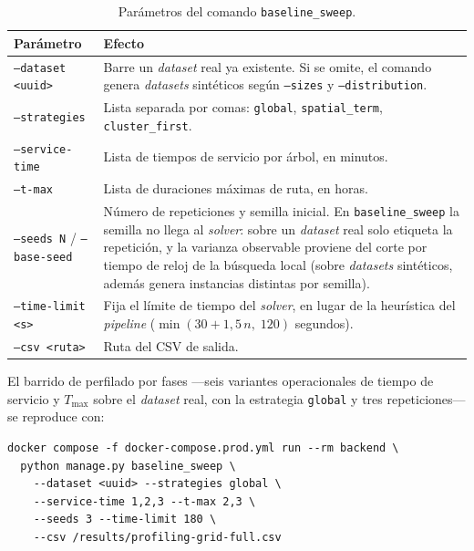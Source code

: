 \begin{table}[H]
  \centering
  \caption{Parámetros del comando \texttt{baseline\_sweep}.}
  \label{tab:anexo_baseline_sweep}
  \small
  \begin{tabularx}{\textwidth}{@{}p{5.5cm} X@{}}
    \toprule
    Parámetro &
      Efecto \\
    \midrule
    \texttt{--dataset <uuid>} &
      Barre un \textit{dataset} real ya existente. Si se omite, el comando genera
      \textit{datasets} sintéticos según \texttt{--sizes} y \texttt{--distribution}. \\
    \texttt{--strategies} &
      Lista separada por comas: \texttt{global}, \texttt{spatial\_term},
      \texttt{cluster\_first}. \\
    \texttt{--service-time} &
      Lista de tiempos de servicio por árbol, en minutos. \\
    \texttt{--t-max} &
      Lista de duraciones máximas de ruta, en horas. \\
    \texttt{--seeds N} / \texttt{--base-seed} &
      Número de repeticiones y semilla inicial. En \texttt{baseline\_sweep} la semilla no llega
      al \textit{solver}: sobre un \textit{dataset} real solo etiqueta la repetición, y la
      varianza observable proviene del corte por tiempo de reloj de la búsqueda local (sobre
      \textit{datasets} sintéticos, además genera instancias distintas por semilla). \\
    \texttt{--time-limit <s>} &
      Fija el límite de tiempo del \textit{solver}, en lugar de la heurística del
      \textit{pipeline} ($\min(30 + 1{,}5\,n,\;120)$ segundos). \\
    \texttt{--csv <ruta>} &
      Ruta del CSV de salida. \\
    \bottomrule
  \end{tabularx}
\end{table}

El barrido de perfilado por fases ---seis variantes operacionales de tiempo de
servicio y $T_{\max}$ sobre el \textit{dataset} real, con la estrategia \texttt{global}
y tres repeticiones--- se reproduce con:

\begin{verbatim}
docker compose -f docker-compose.prod.yml run --rm backend \
  python manage.py baseline_sweep \
    --dataset <uuid> --strategies global \
    --service-time 1,2,3 --t-max 2,3 \
    --seeds 3 --time-limit 180 \
    --csv /results/profiling-grid-full.csv
\end{verbatim}

